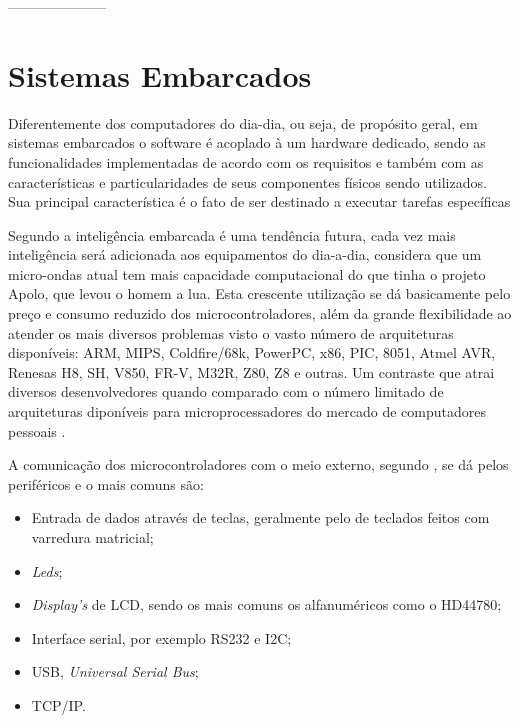 ---------------------

\chapter{Sistemas Embarcados}
\label{cap:sis_embarcados}
Diferentemente dos computadores do dia-dia, ou seja, de propósito geral, em sistemas embarcados o software é acoplado à um hardware dedicado, sendo as funcionalidades implementadas de acordo com os requisitos e também com as características e particularidades de seus componentes físicos sendo utilizados. Sua principal característica é o fato de ser destinado a executar tarefas específicas \cite{li2003real}

Segundo \cite{cunha2013} a inteligência embarcada é uma tendência futura, cada vez mais inteligência será adicionada aos equipamentos do dia-a-dia, considera que um micro-ondas atual tem mais capacidade computacional do que tinha o projeto Apolo, que levou o homem a lua. Esta crescente utilização se dá basicamente pelo preço e consumo reduzido dos microcontroladores, além da grande flexibilidade ao atender os mais diversos problemas visto o vasto número de arquiteturas disponíveis: ARM, MIPS, Coldfire/68k, PowerPC, x86, PIC, 8051, Atmel AVR, Renesas H8, SH, V850, FR-V, M32R, Z80, Z8 e outras. Um contraste que atrai diversos desenvolvedores quando comparado com o número limitado de arquiteturas diponíveis para microprocessadores do mercado de computadores pessoais \cite{germano2011}.

A comunicação dos microcontroladores com o meio externo, segundo \cite{germano2011}, se dá pelos periféricos e o mais comuns são:
\begin{itemize}
\item Entrada de dados através de teclas, geralmente pelo de teclados feitos com varredura matricial;
\item \emph{Leds};
\item \emph{Display’s} de LCD, sendo os mais comuns os alfanuméricos como o HD44780;
\item Interface serial, por exemplo RS232 e I2C;
\item USB, \emph{Universal Serial Bus};
\item TCP/IP.
\end{itemize}

